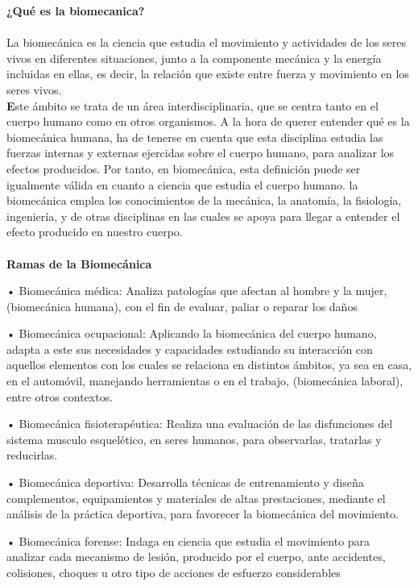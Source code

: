 \documentclass{article}
\begin{document}
\cite{ff1}\textbf{¿Qué es la biomecanica?} \\
\\
La biomecánica es la ciencia que estudia el movimiento y actividades de los seres vivos en diferentes situaciones, junto a la componente mecánica y la energía incluidas en ellas, es decir, la relación que existe entre fuerza y movimiento en los seres vivos. \\
\textbf Este ámbito se trata de un área interdisciplinaria, que se centra tanto en el cuerpo humano como en otros organismos.
A la hora de querer entender qué es la biomecánica humana, ha de tenerse en cuenta que esta disciplina estudia las fuerzas internas y externas ejercidas sobre el cuerpo humano, para analizar los efectos producidos. Por tanto, en biomecánica, esta definición puede ser igualmente válida en cuanto a ciencia que estudia el cuerpo humano.
la biomecánica emplea los conocimientos de la mecánica, la anatomía, la fisiología, ingeniería, y de otras disciplinas en las cuales se apoya para llegar a entender el efecto producido en nuestro cuerpo.\\
\\
\textbf {Ramas de la Biomecánica} \\

\begin{description}
\item •	Biomecánica médica: Analiza patologías que afectan al hombre y la mujer, (biomecánica humana), con el fin de evaluar, paliar o reparar los daños
\item •	Biomecánica ocupacional: Aplicando la biomecánica del cuerpo humano, adapta a este sus necesidades y capacidades estudiando su interacción con aquellos elementos con los cuales se relaciona en distintos ámbitos, ya sea en casa, en el automóvil, manejando herramientas o en el trabajo, (biomecánica laboral), entre otros contextos.
\item •	Biomecánica fisioterapéutica: Realiza una evaluación de las disfunciones del sistema musculo esquelético, en seres humanos, para observarlas, tratarlas y reducirlas.
\item •	Biomecánica deportiva: Desarrolla técnicas de entrenamiento y diseña complementos, equipamientos y materiales de altas prestaciones, mediante el análisis de la práctica deportiva, para favorecer la biomecánica del movimiento. 
\item •	Biomecánica forense: Indaga en ciencia que estudia el movimiento para analizar cada mecanismo de lesión, producido por el cuerpo, ante accidentes, colisiones, choques u otro tipo de acciones de esfuerzo considerables
\end{description}
\end{document}
